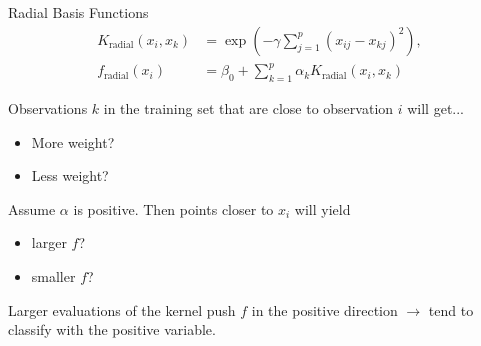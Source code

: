 \documentclass[mathserif, aspectratio=169]{beamer}
\begin{document}
\begin{frame}{Radial Basis Functions}
	\begin{align*}
		K_\text{radial}(x_i,x_k) & = \exp(-\gamma \sum_{j=1}^p(x_{ij}-x_{kj})^2),\\ f_\text{radial}(x_i) &= \beta_0+\sum_{k=1}^p \alpha_k K_\text{radial}(x_i,x_k)
	\end{align*}

	Observations $k$ in the training set that are close to observation $i$ will get...
	\begin{itemize}
		\item More weight?
		\item Less weight?
	\end{itemize}	

	Assume $\alpha$ is positive.  Then points closer to $x_i$ will yield
	\begin{itemize}
		\item larger $f$?
		\item smaller $f$?
	\end{itemize}
Larger evaluations of the kernel push $f$ in the positive direction $\rightarrow$ tend to classify with the positive variable.
\end{frame}
\end{document}
